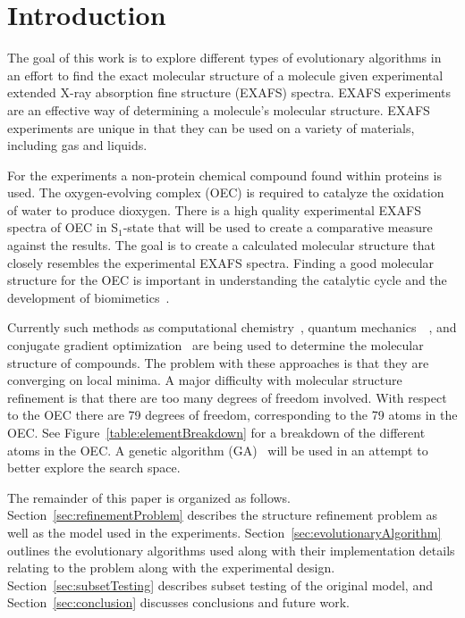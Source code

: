 \documentclass[conference]{IEEEtran}
\begin{document}
\section{Introduction}

The goal of this work is to explore different types of evolutionary algorithms in an effort to find the exact molecular structure of a molecule given experimental extended X-ray absorption fine structure (EXAFS) spectra. EXAFS experiments are an effective way of determining a molecule's molecular structure. EXAFS experiments are unique in that they can be used on a variety of materials, including gas and liquids. 

For the experiments a non-protein chemical compound found within proteins is used. The oxygen-evolving complex (OEC) is required to catalyze the oxidation of water to produce dioxygen. There is a high quality experimental EXAFS spectra of OEC in S$_1$-state that will be used to create a comparative measure against the results. The goal is to create a calculated molecular structure that closely resembles the experimental EXAFS spectra. Finding a good molecular structure for the OEC is important in understanding the catalytic cycle and the development of biomimetics~\cite{luber2011s1}.

Currently such methods as computational chemistry~\cite{hsiao2006exafs}, quantum mechanics~\cite{hsiao2006exafs}~\cite{sproviero2008model}, and conjugate gradient optimization~\cite{luber2011s1} are being used to determine the molecular structure of compounds. The problem with these approaches is that they are converging on local minima. A major difficulty with molecular structure refinement is that there are too many degrees of freedom involved. With respect to the OEC there are 79 degrees of freedom, corresponding to the 79 atoms in the OEC. See Figure~\ref{table:elementBreakdown} for a breakdown of the different atoms in the OEC. A genetic algorithm (GA)~\cite{banzhaf1997genetic} will be used in an attempt to better explore the search space.

The remainder of this paper is  organized as follows. Section~\ref{sec:refinementProblem} describes the structure refinement problem as well as the model used in the experiments. Section~\ref{sec:evolutionaryAlgorithm} outlines the evolutionary algorithms used along with their implementation details relating to the problem along with the experimental design. Section~\ref{sec:subsetTesting} describes subset testing of the original model, and Section~\ref{sec:conclusion} discusses conclusions and future work.
\end{document}
